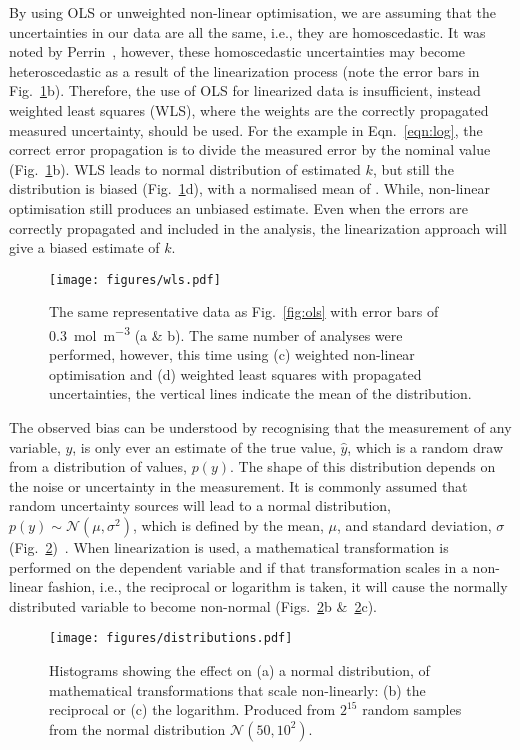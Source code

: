\documentclass[journal=jceda8,manuscript=article]{achemso}
\begin{document}
By using OLS or unweighted non-linear optimisation, we are assuming that the uncertainties in our data are all the same, i.e., they are homoscedastic. 
It was noted by Perrin~\cite{perrin_linear_2017}, however, these homoscedastic uncertainties may become heteroscedastic as a result of the linearization process (note the error bars in Fig.~\ref{fig:wls}b). 
Therefore, the use of OLS for linearized data is insufficient, instead weighted least squares (WLS), where the weights are the correctly propagated measured uncertainty, should be used.
For the example in Eqn.~\ref{eqn:log}, the correct error propagation is to divide the measured error by the nominal value (Fig.~\ref{fig:wls}b).
WLS leads to normal distribution of estimated $k$, but still the distribution is biased (Fig.~\ref{fig:wls}d), with a normalised mean of .
While, non-linear optimisation still produces an unbiased estimate.
Even when the errors are correctly propagated and included in the analysis, the linearization approach will give a biased estimate of $k$.
%
\begin{figure}
  \texttt{[image: figures/wls.pdf]}
  \caption{
    The same representative data as Fig.~\ref{fig:ols} with error bars of \SI{0.3}{{\mol\m^{-3}}} (a \& b).
    The same number of analyses were performed, however, this time using (c) weighted non-linear optimisation and (d) weighted least squares with propagated uncertainties, the vertical lines indicate the mean of the distribution. 
    }
  \label{fig:wls}
\end{figure}
%

The observed bias can be understood by recognising that the measurement of any variable, $y$, is only ever an estimate of the true value, $\hat{y}$, which is a random draw from a distribution of values, $p(y)$. 
The shape of this distribution depends on the noise or uncertainty in the measurement. 
It is commonly assumed that random uncertainty sources will lead to a normal distribution, $p(y) \sim \mathcal{N}(\mu, \sigma^2)$, which is defined by the mean, $\mu$, and standard deviation, $\sigma$ (Fig.~\ref{fig:distributions})~\cite{monk_math_2010}.
When linearization is used, a mathematical transformation is performed on the dependent variable and if that transformation scales in a non-linear fashion, i.e., the reciprocal or logarithm is taken, it will cause the normally distributed variable to become non-normal (Figs.~\ref{fig:distributions}b \&~\ref{fig:distributions}c).
%
\begin{figure}
  \texttt{[image: figures/distributions.pdf]}
  \caption{  
    Histograms showing the effect on (a) a normal distribution, of mathematical transformations that scale non-linearly: (b) the reciprocal or (c) the logarithm. 
    Produced from $2^{15}$ random samples from the normal distribution $\mathcal{N}(50, 10^2)$.
    }
  \label{fig:distributions}
\end{figure}
%
\end{document}
